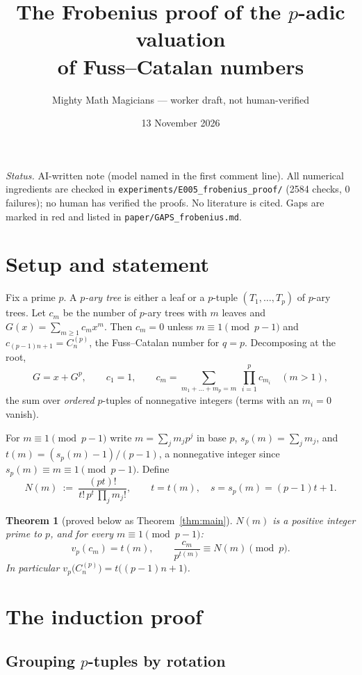 \documentclass[11pt]{amsart}
\title[The Frobenius proof]{The Frobenius proof of the $p$-adic valuation\\
of Fuss--Catalan numbers}
\author{Mighty Math Magicians --- worker draft, not human-verified}
\date{13 November 2026}
\newtheorem{theorem}{Theorem}[section]
\theoremstyle{definition}
\theoremstyle{remark}
\newcommand{\Nn}{N}
\newcommand{\sd}{s_p}
\newcommand{\vp}{v_p}
\begin{document}
\maketitle

\noindent\emph{Status.} AI-written note (model named in the first comment
line). All numerical ingredients are checked in
\texttt{experiments/E005\_frobenius\_proof/} (2584 checks, 0 failures); no
human has verified the proofs. No literature is cited. Gaps are marked in red
and listed in \texttt{paper/GAPS\_frobenius.md}.

\section{Setup and statement}

Fix a prime $p$. A \emph{$p$-ary tree} is either a leaf or a $p$-tuple
$(T_1,\dots,T_p)$ of $p$-ary trees. Let $c_m$ be the number of $p$-ary trees
with $m$ leaves and $G(x)=\sum_{m\ge1}c_mx^m$. Then $c_m=0$ unless
$m\equiv1\pmod{p-1}$ and $c_{(p-1)n+1}=C_n^{(p)}$, the Fuss--Catalan number
for $q=p$. Decomposing at the root,
\begin{equation}\label{eq:G}
  G=x+G^p,\qquad
  c_1=1,\qquad c_m=\sum_{m_1+\dots+m_p=m}\ \prod_{i=1}^p c_{m_i}\quad(m>1),
\end{equation}
the sum over \emph{ordered} $p$-tuples of nonnegative integers (terms with an
$m_i=0$ vanish).

For $m\equiv1\pmod{p-1}$ write $m=\sum_jm_jp^j$ in base $p$, $\sd(m)=\sum_jm_j$,
and $t(m)=(\sd(m)-1)/(p-1)$, a nonnegative integer since
$\sd(m)\equiv m\equiv1\pmod{p-1}$. Define
\[
  \Nn(m)\ :=\ \frac{(pt)!}{t!\,p^t\,\prod_j m_j!},
  \qquad t=t(m),\quad s=\sd(m)=(p-1)t+1 .
\]
\begin{theorem}[proved below as Theorem~\ref{thm:main}]\label{thm:statement}
$\Nn(m)$ is a positive integer prime to $p$, and for every
$m\equiv1\pmod{p-1}$:
\[
  \vp(c_m)=t(m),\qquad \frac{c_m}{p^{t(m)}}\equiv\Nn(m)\pmod p .
\]
In particular $\vp\bigl(C_n^{(p)}\bigr)=t\bigl((p-1)n+1\bigr)$.
\end{theorem}

\section{The induction proof}\label{sec:proof}

\subsection{Grouping $p$-tuples by rotation}
\end{document}
